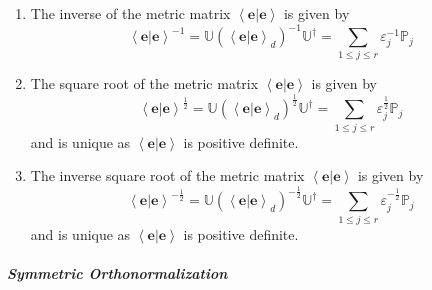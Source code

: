 \documentclass[aps,preprint]{revtex4}%
\begin{document}
\begin{enumerate}
\item The inverse of the metric matrix $\left\langle \left.  \mathbf{e}%
\right\vert \mathbf{e}\right\rangle $ is given by
\begin{equation}
\left\langle \left.  \mathbf{e}\right\vert \mathbf{e}\right\rangle
^{-1}=\mathbb{U}\left(  \left\langle \left.  \mathbf{e}\right\vert
\mathbf{e}\right\rangle _{d}\right)  ^{-1}\mathbb{U}^{\dagger}=\sum
\limits_{1\leq j\leq r}\varepsilon_{j}^{-1}\mathbb{P}_{j}%
\end{equation}


\item The square root of the metric matrix $\left\langle \left.
\mathbf{e}\right\vert \mathbf{e}\right\rangle $ is given by
\begin{equation}
\left\langle \left.  \mathbf{e}\right\vert \mathbf{e}\right\rangle ^{\frac
{1}{2}}=\mathbb{U}\left(  \left\langle \left.  \mathbf{e}\right\vert
\mathbf{e}\right\rangle _{d}\right)  ^{\frac{1}{2}}\mathbb{U}^{\dagger}%
=\sum\limits_{1\leq j\leq r}\varepsilon_{j}^{\frac{1}{2}}\mathbb{P}_{j}%
\end{equation}
and is unique as $\left\langle \left.  \mathbf{e}\right\vert \mathbf{e}%
\right\rangle $ is positive definite.

\item The inverse square root of the metric matrix $\left\langle \left.
\mathbf{e}\right\vert \mathbf{e}\right\rangle $ is given by
\begin{equation}
\left\langle \left.  \mathbf{e}\right\vert \mathbf{e}\right\rangle ^{-\frac
{1}{2}}=\mathbb{U}\left(  \left\langle \left.  \mathbf{e}\right\vert
\mathbf{e}\right\rangle _{d}\right)  ^{-\frac{1}{2}}\mathbb{U}^{\dagger}%
=\sum\limits_{1\leq j\leq r}\varepsilon_{j}^{-\frac{1}{2}}\mathbb{P}_{j}%
\end{equation}
and is unique as $\left\langle \left.  \mathbf{e}\right\vert \mathbf{e}%
\right\rangle $ is positive definite.
\end{enumerate}

\subparagraph{Symmetric Orthonormalization
\label{Symmetric Orthonormalization}}
\end{document}

